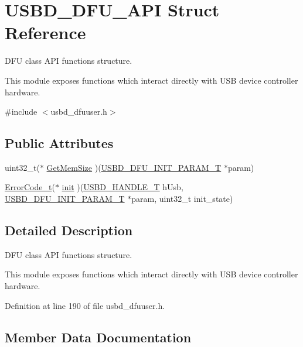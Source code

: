 \hypertarget{struct_u_s_b_d___d_f_u___a_p_i}{}\section{U\+S\+B\+D\+\_\+\+D\+F\+U\+\_\+\+A\+PI Struct Reference}
\label{struct_u_s_b_d___d_f_u___a_p_i}


D\+FU class A\+PI functions structure.

This module exposes functions which interact directly with U\+SB device controller hardware.  




{\ttfamily \#include $<$usbd\+\_\+dfuuser.\+h$>$}

\subsection*{Public Attributes}
\begin{DoxyCompactItemize}
\item 
uint32\+\_\+t($\ast$ \hyperlink{struct_u_s_b_d___d_f_u___a_p_i_a91b64bb4209cfa9e3254bd3ba8963cdc}{Get\+Mem\+Size} )(\hyperlink{group___u_s_b_d___d_f_u_ga8506b43ae2bda83cc8c459114fd3fc82}{U\+S\+B\+D\+\_\+\+D\+F\+U\+\_\+\+I\+N\+I\+T\+\_\+\+P\+A\+R\+A\+M\+\_\+T} $\ast$param)
\item 
\hyperlink{error_8h_a905255056c349318139d94aa4523d516}{Error\+Code\+\_\+t}($\ast$ \hyperlink{struct_u_s_b_d___d_f_u___a_p_i_a88ef3b78fca066f41f8020d39163e1e8}{init} )(\hyperlink{group___u_s_b_d___core_gafdbb2204d929cb9d75736bd2b42342ac}{U\+S\+B\+D\+\_\+\+H\+A\+N\+D\+L\+E\+\_\+T} h\+Usb, \hyperlink{group___u_s_b_d___d_f_u_ga8506b43ae2bda83cc8c459114fd3fc82}{U\+S\+B\+D\+\_\+\+D\+F\+U\+\_\+\+I\+N\+I\+T\+\_\+\+P\+A\+R\+A\+M\+\_\+T} $\ast$param, uint32\+\_\+t init\+\_\+state)
\end{DoxyCompactItemize}


\subsection{Detailed Description}
D\+FU class A\+PI functions structure.

This module exposes functions which interact directly with U\+SB device controller hardware. 



Definition at line 190 of file usbd\+\_\+dfuuser.\+h.



\subsection{Member Data Documentation}
\mbox{\label{struct_u_s_b_d___d_f_u___a_p_i_a91b64bb4209cfa9e3254bd3ba8963cdc}} 
